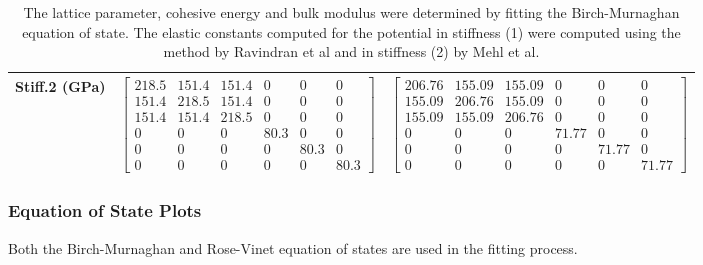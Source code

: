 \begin{table}[ht]
\begin{tabular}{lcccccc}
Stiff.2 (GPa) & \multicolumn{3}{c}{$\begin{bmatrix} 218.5 & 151.4 & 151.4 & 0 & 0 & 0 \\ 151.4 & 218.5 & 151.4 & 0 & 0 & 0 \\ 151.4 & 151.4 & 218.5 & 0 & 0 & 0 \\ 0 & 0 & 0 & 80.3 & 0 & 0 \\ 0 & 0 & 0 & 0 & 80.3 & 0 \\ 0 & 0 & 0 & 0 & 0 & 80.3 \end{bmatrix}$}   & \multicolumn{3}{c}{$\begin{bmatrix} 206.76 & 155.09 & 155.09 & 0 & 0 & 0 \\ 155.09 & 206.76 & 155.09 & 0 & 0 & 0 \\ 155.09 & 155.09 & 206.76 & 0 & 0 & 0 \\ 0 & 0 & 0 & 71.77 & 0 & 0 \\ 0 & 0 & 0 & 0 & 71.77 & 0 \\ 0 & 0 & 0 & 0 & 0 & 71.77 \end{bmatrix}$} \\
\hline\hline
\end{tabular}
\caption{The lattice parameter, cohesive energy and bulk modulus were determined by fitting the Birch-Murnaghan equation of state.  The elastic constants computed for the potential in stiffness (1) were computed using the method by Ravindran et al\cite{dfttisiravindran} and in stiffness (2) by Mehl et al\cite{mehlsp}\cite{elasticpropertiesmehl}.}
\label{table:fepd-febcc-dftvspotential}
\end{table}



\subsubsection{Equation of State Plots}

Both the Birch-Murnaghan and Rose-Vinet equation of states are used in the fitting process.

